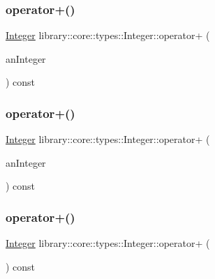 \subsubsection{\texorpdfstring{operator+()}{operator+()}\hspace{0.1cm}{\footnotesize\ttfamily [1/3]}}
{\footnotesize\ttfamily \hyperlink{classlibrary_1_1core_1_1types_1_1_integer}{Integer} library\+::core\+::types\+::\+Integer\+::operator+ (\begin{DoxyParamCaption}\item[{const \hyperlink{classlibrary_1_1core_1_1types_1_1_integer}{Integer} \&}]{an\+Integer }\end{DoxyParamCaption}) const}

\mbox{\label{classlibrary_1_1core_1_1types_1_1_integer_afe13541715633da0223c4c70b9142cf7}} 
\subsubsection{\texorpdfstring{operator+()}{operator+()}\hspace{0.1cm}{\footnotesize\ttfamily [2/3]}}
{\footnotesize\ttfamily \hyperlink{classlibrary_1_1core_1_1types_1_1_integer}{Integer} library\+::core\+::types\+::\+Integer\+::operator+ (\begin{DoxyParamCaption}\item[{const \hyperlink{classlibrary_1_1core_1_1types_1_1_integer_a623afb1580f870fd8a1997b1c12c917d}{Integer\+::\+Value\+Type} \&}]{an\+Integer }\end{DoxyParamCaption}) const}

\mbox{\label{classlibrary_1_1core_1_1types_1_1_integer_adaf665cd81d9befd1f764e11c2be9b69}} 
\subsubsection{\texorpdfstring{operator+()}{operator+()}\hspace{0.1cm}{\footnotesize\ttfamily [3/3]}}
{\footnotesize\ttfamily \hyperlink{classlibrary_1_1core_1_1types_1_1_integer}{Integer} library\+::core\+::types\+::\+Integer\+::operator+ (\begin{DoxyParamCaption}{ }\end{DoxyParamCaption}) const}

